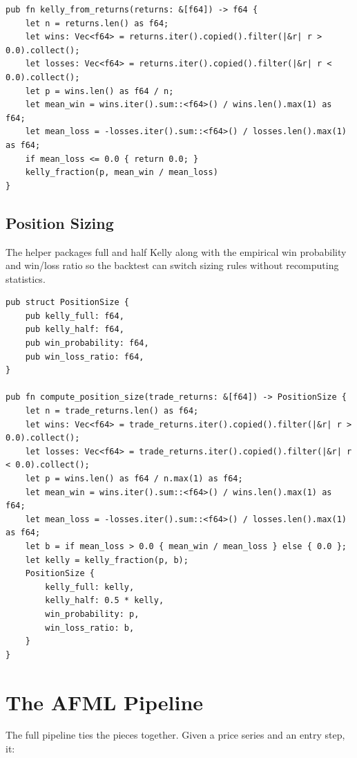 \begin{lstlisting}[caption={Kelly from a series of trade returns}]
pub fn kelly_from_returns(returns: &[f64]) -> f64 {
    let n = returns.len() as f64;
    let wins: Vec<f64> = returns.iter().copied().filter(|&r| r > 0.0).collect();
    let losses: Vec<f64> = returns.iter().copied().filter(|&r| r < 0.0).collect();
    let p = wins.len() as f64 / n;
    let mean_win = wins.iter().sum::<f64>() / wins.len().max(1) as f64;
    let mean_loss = -losses.iter().sum::<f64>() / losses.len().max(1) as f64;
    if mean_loss <= 0.0 { return 0.0; }
    kelly_fraction(p, mean_win / mean_loss)
}
\end{lstlisting}

\subsection{Position Sizing}

The  helper packages full and half Kelly
along with the empirical win probability and win/loss ratio so the
backtest can switch sizing rules without recomputing statistics.

\begin{lstlisting}[caption={Position sizing summary}]
pub struct PositionSize {
    pub kelly_full: f64,
    pub kelly_half: f64,
    pub win_probability: f64,
    pub win_loss_ratio: f64,
}

pub fn compute_position_size(trade_returns: &[f64]) -> PositionSize {
    let n = trade_returns.len() as f64;
    let wins: Vec<f64> = trade_returns.iter().copied().filter(|&r| r > 0.0).collect();
    let losses: Vec<f64> = trade_returns.iter().copied().filter(|&r| r < 0.0).collect();
    let p = wins.len() as f64 / n.max(1) as f64;
    let mean_win = wins.iter().sum::<f64>() / wins.len().max(1) as f64;
    let mean_loss = -losses.iter().sum::<f64>() / losses.len().max(1) as f64;
    let b = if mean_loss > 0.0 { mean_win / mean_loss } else { 0.0 };
    let kelly = kelly_fraction(p, b);
    PositionSize {
        kelly_full: kelly,
        kelly_half: 0.5 * kelly,
        win_probability: p,
        win_loss_ratio: b,
    }
}
\end{lstlisting}

\section{The AFML Pipeline}

The full pipeline ties the pieces together. Given a price series
and an entry step, it:

